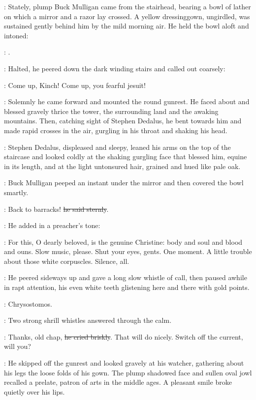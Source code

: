 :
Stately, plump Buck Mulligan came from the stairhead,
bearing a bowl of lather
on which a mirror and a razor lay crossed.
A yellow dressinggown, ungirdled,
was sustained gently behind him by the mild morning air.
He held the bowl aloft and intoned:

\Mulligan:
.

:
Halted, he peered down the dark winding stairs
and called out coarsely:

\Mulligan:
Come up, Kinch!
Come up, you fearful jesuit!

:
Solemnly he came forward and mounted the round gunrest.
He faced about and blessed gravely thrice the tower,
the surrounding land and the awaking mountains.
Then, catching sight of Stephen Dedalus,
he bent towards him and made rapid crosses in the air,
gurgling in his throat and shaking his head.

:
Stephen Dedalus, displeased and sleepy,
leaned his arms on the top of the staircase
and looked coldly at the shaking gurgling face that blessed him,
equine in its length,
and at the light untonsured hair,
grained and hued like pale oak.

:
Buck Mulligan peeped an instant under the mirror
and then covered the bowl smartly.

\Mulligan:
Back to barracks!
\sout{he said sternly}.

:
He added in a preacher's tone:

\Mulligan:
For this, O dearly beloved,
is the genuine Christine:
body and soul and blood and ouns.
Slow music, please.
Shut your eyes, gents.
One moment.
A little trouble about those white corpuscles.
Silence, all.

:
He peered sideways up and gave a long slow whistle of call,
then paused awhile in rapt attention,
his even white teeth glistening here and there with gold points.

\StephenInt:
Chrysostomos.

:
Two strong shrill whistles answered through the calm.

\Mulligan:
Thanks, old chap,
\sout{he cried briskly}.
That will do nicely.
Switch off the current, will you?

:
He skipped off the gunrest
and looked gravely at his watcher,
gathering about his legs the loose folds of his gown.
The plump shadowed face and sullen oval jowl
recalled a prelate,
patron of arts in the middle ages.
A pleasant smile broke quietly over his lips.


